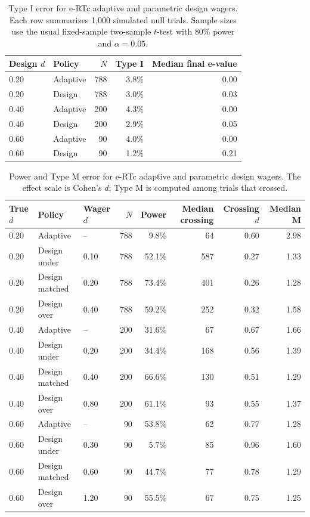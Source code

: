 \begin{table}[htbp]
\centering
\caption{Type I error for e-RTc adaptive and parametric design wagers. Each row summarizes 1{,}000 simulated null trials. Sample sizes use the usual fixed-sample two-sample $t$-test with 80\% power and $\alpha = 0.05$.}
\label{tab:ertc_design_type1}
\begin{tabular}{@{}llrrr@{}}
\toprule
Design $d$ & Policy & $N$ & Type I & Median final e-value \\
\midrule
0.20 & Adaptive & 788 & 3.8\% & 0.00 \\
0.20 & Design & 788 & 3.0\% & 0.03 \\
0.40 & Adaptive & 200 & 4.3\% & 0.00 \\
0.40 & Design & 200 & 2.9\% & 0.05 \\
0.60 & Adaptive & 90 & 4.0\% & 0.00 \\
0.60 & Design & 90 & 1.2\% & 0.21 \\
\bottomrule
\end{tabular}
\end{table}

\begin{table}[htbp]
\centering
\caption{Power and Type M error for e-RTc adaptive and parametric design wagers. The effect scale is Cohen's $d$; Type M is computed among trials that crossed.}
\label{tab:ertc_design_power_type_m}
\begin{tabular}{@{}lllrrrrr@{}}
\toprule
True $d$ & Policy & Wager $d$ & $N$ & Power & Median crossing & Crossing $d$ & Median M \\
\midrule
0.20 & Adaptive & -- & 788 & 9.8\% & 64 & 0.60 & 2.98 \\
0.20 & Design under & 0.10 & 788 & 52.1\% & 587 & 0.27 & 1.33 \\
0.20 & Design matched & 0.20 & 788 & 73.4\% & 401 & 0.26 & 1.28 \\
0.20 & Design over & 0.40 & 788 & 59.2\% & 252 & 0.32 & 1.58 \\
0.40 & Adaptive & -- & 200 & 31.6\% & 67 & 0.67 & 1.66 \\
0.40 & Design under & 0.20 & 200 & 34.4\% & 168 & 0.56 & 1.39 \\
0.40 & Design matched & 0.40 & 200 & 66.6\% & 130 & 0.51 & 1.29 \\
0.40 & Design over & 0.80 & 200 & 61.1\% & 93 & 0.55 & 1.37 \\
0.60 & Adaptive & -- & 90 & 53.8\% & 62 & 0.77 & 1.28 \\
0.60 & Design under & 0.30 & 90 & 5.7\% & 85 & 0.96 & 1.60 \\
0.60 & Design matched & 0.60 & 90 & 44.7\% & 77 & 0.78 & 1.29 \\
0.60 & Design over & 1.20 & 90 & 55.5\% & 67 & 0.75 & 1.25 \\
\bottomrule
\end{tabular}
\end{table}
